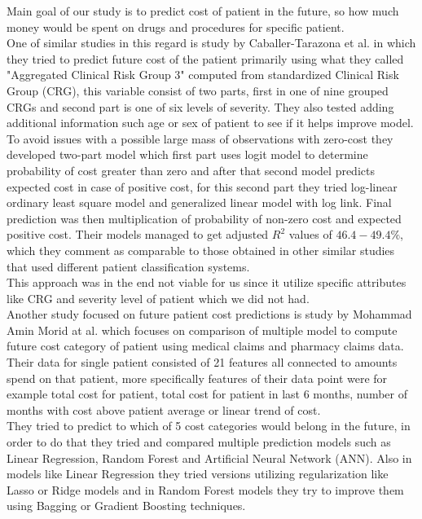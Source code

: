 
Main goal of our study is to predict cost of patient in the future, so how much money would be spent on drugs and procedures for specific patient.
\\
 
One of similar studies in this regard is study by Caballer-Tarazona et al. \cite{caballer2019predicting} in which they tried to predict future cost of the patient primarily using what they called "Aggregated Clinical Risk Group 3" computed from standardized Clinical Risk Group (CRG), this variable consist of two parts, first in one of nine grouped CRGs and second part is one of six levels of severity. They also tested adding additional information such age or sex of patient to see if it helps improve model. To avoid issues with a possible large mass of observations with zero-cost they developed two-part model which first part uses logit model to determine probability of cost greater than zero and after that second model predicts expected cost in case of positive cost, for this second part they tried log-linear ordinary least square model and generalized linear model with log link. Final prediction was then multiplication of probability of non-zero cost and expected positive cost. Their models managed to get adjusted $R^2$ values of $46.4-49.4\%$, which they comment as comparable to those obtained in other similar studies that used different patient classification systems. 
\\

This approach was in the end not viable for us since it utilize specific attributes like CRG and severity level of patient which we did not had.
\\

Another study focused on future patient cost predictions is study by Mohammad Amin Morid at al. \cite{morid2018supervised} which focuses on comparison of multiple model to compute future cost category of patient using medical claims and pharmacy claims data. 
\\

Their data for single patient consisted of 21 features all connected to amounts spend on that patient, more specifically features of their data point were for example total cost for patient, total cost for patient in last 6 months, number of months with cost above patient average or linear trend of cost.
\\

They tried to predict to which of 5 cost categories would belong in the future, in order to do that they tried and compared multiple prediction models such as Linear Regression, Random Forest and Artificial Neural Network (ANN). Also in models like Linear Regression they tried versions utilizing regularization like Lasso or Ridge models and in Random Forest models they try to improve them using Bagging or Gradient Boosting techniques.
\\

